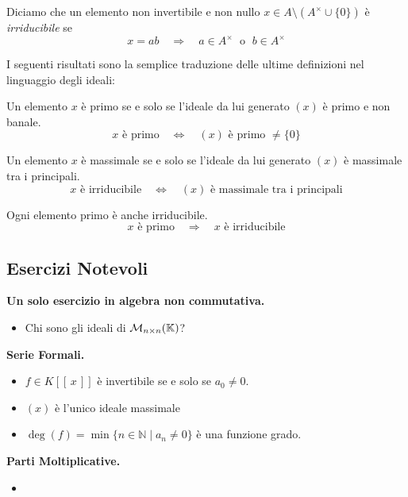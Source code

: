 \begin{multicols}{2}
\begin{definition}[Irriducibile]
	Diciamo che un elemento non invertibile e non nullo $ x \in A\setminus(A^\times \cup \{0\}) $ è \emph{irriducibile} se \[ x = ab \quad\Rightarrow\quad a\in A^\times \; \text{ o }\; b \in A^\times \]
\end{definition}

I seguenti risultati sono la semplice traduzione delle ultime definizioni nel linguaggio degli ideali:

\begin{theorem}\label{prpr}
	Un elemento $ x $ è primo se e solo se l'ideale da lui generato $ (x) $ è primo e non banale.
	\[ x \text{ è primo} \quad\Leftrightarrow\quad (x) \text{ è primo } \neq \{0\}  \]
\end{theorem}

\begin{theorem}\label{mama}
	Un elemento $ x $ è massimale se e solo se l'ideale da lui generato $ (x) $ è massimale tra i principali.
	\[ x \text{ è irriducibile} \quad\Leftrightarrow\quad (x) \text{ è massimale tra i principali} \]
\end{theorem}

\begin{theorem}\label{epei}
	Ogni elemento primo è anche irriducibile.
	\[ x \text{ è primo} \quad\Rightarrow\quad x \text{ è irriducibile} \]
\end{theorem}

\end{multicols}


\subsection{Esercizi Notevoli}
\begin{multicols}{2}

\textbf{Un solo esercizio in algebra non commutativa.}
\begin{itemize}
	\item Chi sono gli ideali di $ \mathcal{M}_{n \times n}(\mathbb{K}) $?

\end{itemize}

\textbf{Serie Formali.}
\begin{itemize}
	\item $ f \in K[[\, x\,]] $ è invertibile se e solo se $ a_0 \neq 0 $.
	
	\item $ (x) $ è l'unico ideale massimale
	
	\item $ \deg(f) = \min \{n \in \mathbb{N} \mid a_n \neq 0 \} $ è una funzione grado.
\end{itemize}


\textbf{Parti Moltiplicative.}


\begin{itemize}
	\item 
\end{itemize}
	
\end{multicols}


